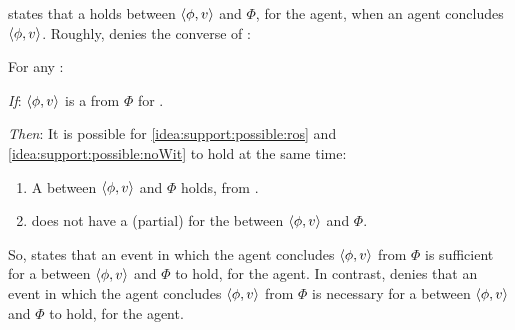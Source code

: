 \begin{note}
  \supportI{} states that a \ros{} holds between \(\langle \phi, v \rangle\) and \(\Phi\), for the agent, when an agent concludes \(\langle \phi, v \rangle\).
  Roughly, \supportII{} denies the converse of \supportI{}:

  \begin{idea}[\supportII{}]%
    \label{idea:support:possible}%
    For any \ros{}:
    \begin{itenum}
    \item[\emph{If}:]
      \(\langle \phi, v \rangle\) is a \fc{} from \(\Phi\) for \vAgent{}.
    \item[\emph{Then}:]
      It is possible for \ref{idea:support:possible:ros} and \ref{idea:support:possible:noWit} to hold at the same time:
      \begin{enumerate}[label=\alph*., ref=(\alph*)]
      \item
        \label{idea:support:possible:ros}
        A \ros{} between \(\langle \phi, v \rangle\) and \(\Phi\) holds, from .
      \item
        \label{idea:support:possible:noWit}
        \vAgent{} does not have a (partial) \wit{} for the \ros{} between \(\langle \phi, v \rangle\) and \(\Phi\).
      \end{enumerate}
    \end{itenum}
  \end{idea}

  \noindent%
  So, \supportI{} states that an event in which the agent concludes \(\langle \phi, v \rangle\) from \(\Phi\) is sufficient for a \ros{} between \(\langle \phi, v \rangle\) and \(\Phi\) to hold, for the agent.
  In contrast, \supportII{} denies that an event in which the agent concludes \(\langle \phi, v \rangle\) from \(\Phi\) is necessary for a \ros{} between \(\langle \phi, v \rangle\) and \(\Phi\) to hold, for the agent.
\end{note}

